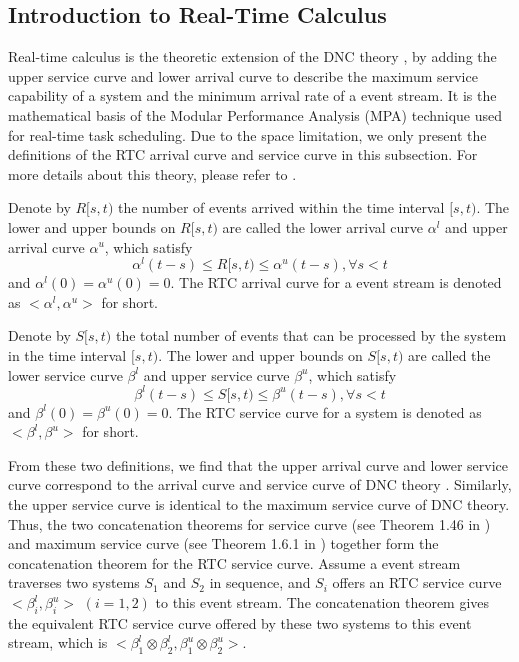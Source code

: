 \documentclass[preprint]{elsarticle}
\begin{document}
\subsection{Introduction to Real-Time Calculus}\label{intrortc}
Real-time calculus \cite{1253607} is the theoretic extension of the DNC theory \cite{Boudec2001Network}, by adding the upper service curve and lower arrival curve to describe the maximum service capability of a system and the minimum arrival rate of a event stream. It is the mathematical basis of the Modular Performance Analysis (MPA) \cite{Wandeler2006System} technique used for real-time task scheduling. Due to the space limitation, we only present the definitions of the RTC arrival curve and service curve in this subsection. For more details about this theory, please refer to \cite{1253607}.
\begin{rmk}\label{acu}
Denote by $R[s,t)$ the number of events arrived within the time interval $[s,t)$. The lower and upper bounds on $R[s,t)$ are called the lower arrival curve $\alpha^l$ and upper arrival curve $\alpha^u$, which satisfy
$$\alpha^l(t-s)\leq R[s,t)\leq \alpha^u(t-s),\forall s<t$$
and $\alpha^l(0)=\alpha^u(0)=0$. The RTC arrival curve for a event stream is denoted as $<\alpha^l,\alpha^u>$ for short.
\end{rmk}

\begin{rmk}
Denote by $S[s,t)$ the total number of events that can be processed by the system in the time interval $[s,t)$. The lower and upper bounds on $S[s,t)$ are called the lower service curve $\beta^l$ and upper service curve $\beta^u$, which satisfy
$$\beta^l(t-s)\leq S[s,t)\leq \beta^u(t-s),\forall s<t$$
and $\beta^l(0)=\beta^u(0)=0$. The RTC service curve for a system is denoted as $<\beta^l,\beta^u>$ for short.
\end{rmk}

From these two definitions, we find that the upper arrival curve and lower service curve correspond to the arrival curve and service curve of DNC theory \cite{Boudec2001Network}. Similarly, the upper service curve is identical to the maximum service curve of DNC theory. Thus, the two concatenation theorems for service curve (see Theorem 1.46 in \cite{Boudec2001Network}) and maximum service curve (see Theorem 1.6.1 in \cite{Boudec2001Network}) together form the concatenation theorem for the RTC service curve. Assume a event stream traverses two systems $S_1$ and $S_2$ in sequence, and $S_i$ offers an RTC service curve $<\beta^l_i,\beta^u_i>$ $(i=1,2)$ to this event stream. The concatenation theorem gives the equivalent RTC service curve offered by these two systems to this event stream, which is $<\beta^l_1\otimes\beta^l_2,\beta^u_1\otimes\beta^u_2>$.
\end{document}
